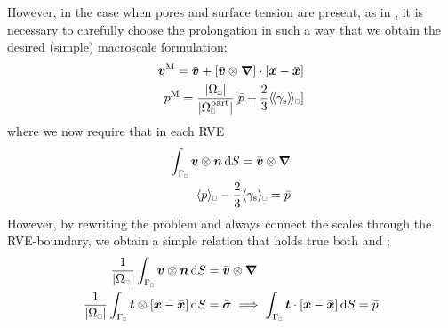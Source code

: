 \documentclass[MikaelDissertation.tex]{subfiles}
\begin{document}
However, in the case when pores and surface tension are present, as in , it is necessary to carefully choose the prolongation in such a way that we obtain the desired (simple) macroscale formulation:
\begin{align}
 \ta v^\macro = \bar{\ta v} + [\bar{\ta v}\outerp\diff]\cdot[\ta x - \bar{\ta x}]
\\
 p^\macro = \frac{\volume}{|\Omega_\rve^\particle|}[\bar{p} + \frac23\shomgen{\gamma_\surf}]
\end{align}
where we now require that in each RVE
\begin{align}
 \int_{\Gamma_\rve}\ta v\outerp\ta n\dif S = \bar{\ta v}\outerp\diff
\\
 \homgen{p} - \frac23\homgen{\gamma_\surf} = \bar{p}
\end{align}
However, by rewriting the problem and always connect the scales through the RVE-boundary, we obtain a simple relation that holds true both  and ;
\begin{align}
 \frac{1}{\volume}\int_{\Gamma_\rve}\ta v\outerp\ta n\dif S &= \bar{\ta v}\outerp\diff
\\
 \frac{1}{\volume}\int_{\Gamma_\rve}\ta t\outerp[\ta x-\bar{\ta x}]\dif S &= \bar{\ts\sigma} \implies \int_{\Gamma_\rve}\ta t\cdot[\ta x-\bar{\ta x}]\dif S = \bar{p}
\end{align}
\end{document}
